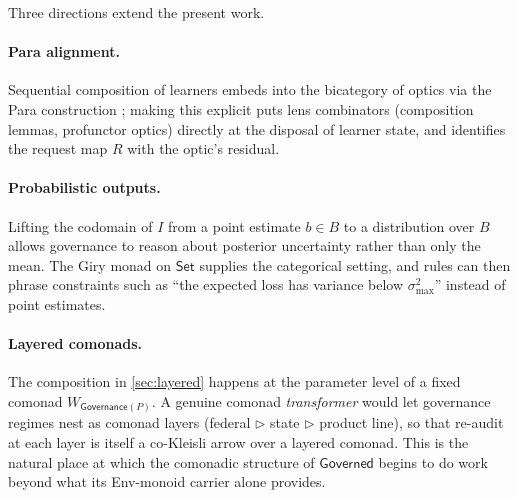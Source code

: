 \documentclass[journal,10pt]{IEEEtran}
\theoremstyle{plain}
\theoremstyle{definition}
\theoremstyle{remark}
\newcommand{\Set}{\mathsf{Set}}
\newcommand{\Governed}{\mathsf{Governed}}
\newcommand{\Governance}{\mathsf{Governance}}
\begin{document}
Three directions extend the present work.

\paragraph*{Para alignment.}
Sequential composition of learners embeds into the bicategory of
optics via the Para construction
\cite{CapucciGavranovicHedgesRischel}; making this explicit puts lens
combinators (composition lemmas, profunctor optics) directly at the
disposal of learner state, and identifies the request map $R$ with
the optic's residual.

\paragraph*{Probabilistic outputs.}
Lifting the codomain of $I$ from a point estimate $b \in B$ to a
distribution over $B$ allows governance to reason about posterior
uncertainty rather than only the mean. The Giry monad on $\Set$
supplies the categorical setting, and rules can then phrase
constraints such as ``the expected loss has variance below
$\sigma^2_{\max}$'' instead of point estimates.

\paragraph*{Layered comonads.}
The composition in \cref{sec:layered} happens at the parameter level
of a fixed comonad $W_{\Governance(P)}$. A genuine comonad
\emph{transformer} would let governance regimes nest as comonad
layers (federal $\rhd$ state $\rhd$ product line), so that re-audit
at each layer is itself a co-Kleisli arrow over a layered comonad.
This is the natural place at which the comonadic structure of
$\Governed$ begins to do work beyond what its Env-monoid carrier
alone provides.

\end{document}
